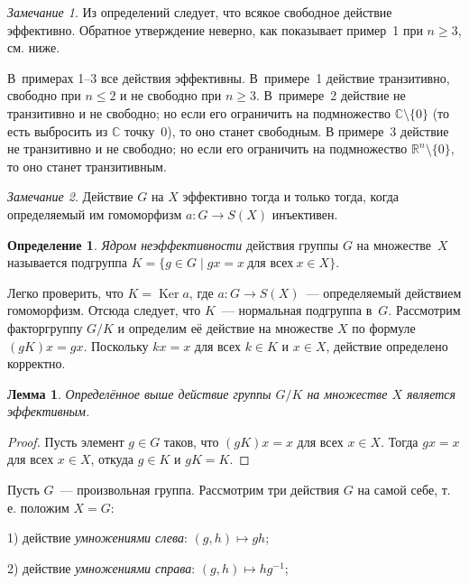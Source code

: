 \documentclass[a4paper,10pt]{amsart}
\newcommand{\Ker}{\mathop{\mathrm{Ker}}}
\def\CC{{\mathbb C}}%
\def\RR{{\mathbb R}}%
\newtheorem{lemma}{Лемма}
\theoremstyle{definition}
\newtheorem{definition}{Определение}
\theoremstyle{remark}
\newtheorem{remark}{Замечание}
\begin{document}
\begin{remark}
Из определений следует, что всякое свободное действие эффективно.
Обратное утверждение неверно, как показывает пример~1 при $n
\geqslant 3$, см. ниже.
\end{remark}

В~примерах 1--3 все действия эффективны. В~примере~1 действие
транзитивно, свободно при $n \leqslant 2$ и не свободно при $n
\geqslant 3$. В~примере~2 действие не транзитивно и не свободно; но
если его ограничить на подмножество $\CC \setminus \lbrace 0
\rbrace$ (то есть выбросить из $\CC$ точку~$0$), то оно станет
свободным. В примере~3 действие не транзитивно и не свободно; но
если его ограничить на подмножество $\RR^n \setminus \lbrace 0
\rbrace$, то оно станет транзитивным.

\begin{remark}
Действие $G$ на $X$ эффективно тогда и только тогда, когда
определяемый им гомоморфизм $a \colon G \to S(X)$ инъективен.
\end{remark}

\begin{definition}
{\it Ядром неэффективности} действия группы $G$ на множестве~$X$
называется подгруппа $K = \{ g\in G \mid gx = x \ \text{для всех} \
x\in X\}$.
\end{definition}

Легко проверить, что $K = \Ker a$, где $a \colon G \to S(X)$~---
определяемый действием гомоморфизм. Отсюда следует, что $K$~---
нормальная подгруппа в~$G$. Рассмотрим факторгруппу $G/K$ и
определим её действие на множестве $X$ по формуле $(gK)x = gx$.
Поскольку $kx = x$ для всех $k \in K$ и $x \in X$, действие
определено корректно.

\begin{lemma}
Определённое выше действие группы $G/K$ на множестве $X$ является
эффективным.
\end{lemma}

\begin{proof}
Пусть элемент $g \in G$ таков, что $(gK)x = x$ для всех $x \in X$.
Тогда $gx = x$ для всех $x \in X$, откуда $g \in K$ и $gK = K$.
\end{proof}

Пусть $G$~--- произвольная группа. Рассмотрим три действия $G$ на
самой себе, т.\,е. положим $X=G$:

1) действие {\it умножениями слева}: $(g,h)\mapsto gh$;

2) действие {\it умножениями справа}: $(g,h)\mapsto hg^{-1}$;
\end{document}

